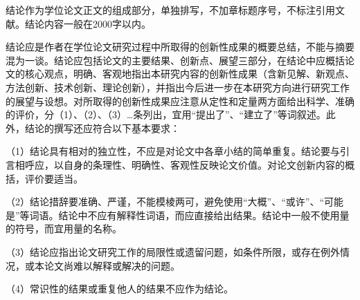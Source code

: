 \begin{conclusion}
\label{chap:conclusion}

结论作为学位论文正文的组成部分，单独排写，不加章标题序号，不标注引用文献。结论内容一般在2000字以内。

结论应是作者在学位论文研究过程中所取得的创新性成果的概要总结，不能与摘要混为一谈。结论应包括论文的主要结果、创新点、展望三部分，在结论中应概括论文的核心观点，明确、客观地指出本研究内容的创新性成果（含新见解、新观点、方法创新、技术创新、理论创新），并指出今后进一步在本研究方向进行研究工作的展望与设想。对所取得的创新性成果应注意从定性和定量两方面给出科学、准确的评价，分（1）、（2）、（3）…条列出，宜用“提出了”、“建立了”等词叙述。此外，结论的撰写还应符合以下基本要求：

（1）结论具有相对的独立性，不应是对论文中各章小结的简单重复。结论要与引言相呼应，以自身的条理性、明确性、客观性反映论文价值。对论文创新内容的概括，评价要适当。

（2）结论措辞要准确、严谨，不能模棱两可，避免使用“大概”、“或许”、“可能是”等词语。结论中不应有解释性词语，而应直接给出结果。结论中一般不使用量的符号，而宜用量的名称。

（3）结论应指出论文研究工作的局限性或遗留问题，如条件所限，或存在例外情况，或本论文尚难以解释或解决的问题。

（4）常识性的结果或重复他人的结果不应作为结论。

\end{conclusion} 